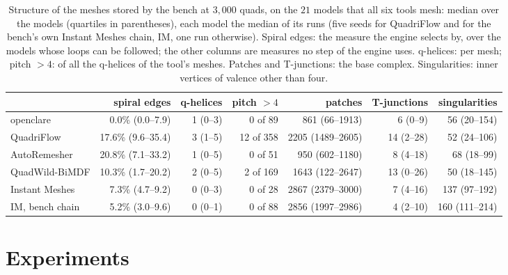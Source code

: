\documentclass[11pt,a4paper]{article}
\begin{document}
\begin{table}[t]
\centering
\footnotesize
\setlength{\tabcolsep}{3pt}
\begin{tabular}{lrrrrrr}
\toprule
& spiral edges & q-helices & pitch $> 4$ & patches & T-junctions & singularities \\
\midrule
openclare & 0.0\% (0.0--7.9) & 1 (0--3) & 0 of 89 & 861 (66--1913) & 6 (0--9) & 56 (20--154) \\
QuadriFlow & 17.6\% (9.6--35.4) & 3 (1--5) & 12 of 358 & 2205 (1489--2605) & 14 (2--28) & 52 (24--106) \\
AutoRemesher & 20.8\% (7.1--33.2) & 1 (0--5) & 0 of 51 & 950 (602--1180) & 8 (4--18) & 68 (18--99) \\
QuadWild-BiMDF & 10.3\% (1.7--20.2) & 2 (0--5) & 2 of 169 & 1643 (122--2647) & 13 (0--26) & 50 (18--145) \\
Instant Meshes & 7.3\% (4.7--9.2) & 0 (0--3) & 0 of 28 & 2867 (2379--3000) & 7 (4--16) & 137 (97--192) \\
IM, bench chain & 5.2\% (3.0--9.6) & 0 (0--1) & 0 of 88 & 2856 (1997--2986) & 4 (2--10) & 160 (111--214) \\
\bottomrule
\end{tabular}
\caption{Structure of the meshes stored by the bench at $3{,}000$ quads, on
the $21$ models that all six tools mesh: median over the models (quartiles in
parentheses), each model the median of its runs (five seeds for QuadriFlow
and for the bench's own Instant Meshes chain, IM, one run otherwise). Spiral
edges: the measure the engine selects by, over the models whose loops can be
followed; the other columns are measures no step of the engine uses.
q-helices: per mesh; pitch $> 4$: of all the q-helices of the tool's meshes.
Patches and T-junctions: the base complex. Singularities: inner vertices of
valence other than four.}
\label{tab:structure}
\end{table}

\section{Experiments}\label{sec:experiments}
\end{document}
